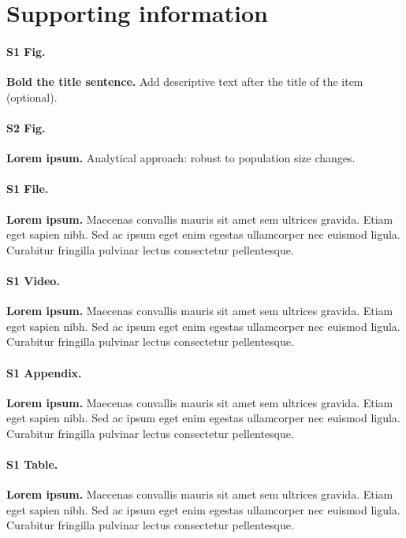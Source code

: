 \documentclass[10pt,letterpaper]{article}
\begin{document}
\section*{Supporting information}

\paragraph*{S1 Fig.}
\label{S1_Fig}
{\bf Bold the title sentence.} Add descriptive text after the title of the item (optional).

\paragraph*{S2 Fig.}
\label{S2_Fig}
{\bf Lorem ipsum.} Analytical approach: robust to population size changes.

\paragraph*{S1 File.}
\label{S1_File}
{\bf Lorem ipsum.}  Maecenas convallis mauris sit amet sem ultrices gravida. Etiam eget sapien nibh. Sed ac ipsum eget enim egestas ullamcorper nec euismod ligula. Curabitur fringilla pulvinar lectus consectetur pellentesque.

\paragraph*{S1 Video.}
\label{S1_Video}
{\bf Lorem ipsum.}  Maecenas convallis mauris sit amet sem ultrices gravida. Etiam eget sapien nibh. Sed ac ipsum eget enim egestas ullamcorper nec euismod ligula. Curabitur fringilla pulvinar lectus consectetur pellentesque.

\paragraph*{S1 Appendix.}
\label{S1_Appendix}
{\bf Lorem ipsum.} Maecenas convallis mauris sit amet sem ultrices gravida. Etiam eget sapien nibh. Sed ac ipsum eget enim egestas ullamcorper nec euismod ligula. Curabitur fringilla pulvinar lectus consectetur pellentesque.

\paragraph*{S1 Table.}
\label{S1_Table}
{\bf Lorem ipsum.} Maecenas convallis mauris sit amet sem ultrices gravida. Etiam eget sapien nibh. Sed ac ipsum eget enim egestas ullamcorper nec euismod ligula. Curabitur fringilla pulvinar lectus consectetur pellentesque.
\end{document}
